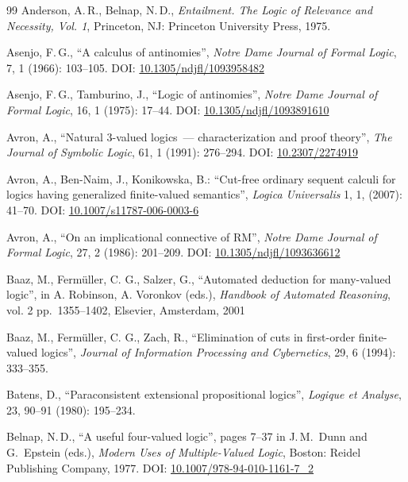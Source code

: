 \documentclass[10pt,a4paper]{article}
\theoremstyle{definition}
\newcommand{\3}{\vspace{.3in}}
\newcommand{\2}{\vspace{.2in}}
\newcommand{\1}{\vspace{.1in}}
\newcommand{\5}{\vspace{.05in}}
\newcommand\DOI[2]{DOI: \href{#1#2}{#2}}
\newcommand{\ts}{\,}
\begin{document}
\begin{thebibliography}{99}
Anderson, A.\ts R., Belnap, N.\ts D.,  \textit{Entailment. The Logic of Relevance and Necessity, Vol. 1}, Princeton, NJ: Princeton University Press, 1975.

Asenjo, F.\ts G., ``A calculus of antinomies'', \textit{Notre Dame Journal of Formal Logic}, 7, 1 (1966): 103--105.
\DOI{http://dx.doi.org/}{10.1305/ndjfl/1093958482}

Asenjo, F.\ts G., Tamburino, J., ``Logic of antinomies'', \textit{Notre Dame Journal of Formal Logic}, 16, 1 (1975): 17--44. 
\DOI{http://dx.doi.org/}{10.1305/ndjfl/1093891610}

Avron, A., ``Natural 3-valued logics~--- characterization and proof theory'', \textit{The Journal of Symbolic Logic}, 61, 1 (1991): 276--294.  
\DOI{http://dx.doi.org/}{10.2307/2274919}

Avron, A., Ben-Naim, J., Konikowska, B.:  ``Cut-free ordinary sequent calculi for logics having generalized finite-valued semantics'',  \textit{Logica Universalis} 1, 1, (2007): 41--70.  \DOI{http://dx.doi.org/}{10.1007/s11787-006-0003-6}

Avron, A., ``On an implicational connective of RM'', \textit{Notre Dame Journal of Formal Logic}, 27, 2 (1986): 201--209.
\DOI{http://dx.doi.org/}{10.1305/ndjfl/1093636612}

Baaz, M., Ferm\"uller, C. G., Salzer, G., ``Automated deduction for many-valued logic'',
in A. Robinson, A. Voronkov (eds.),  \textit{Handbook of Automated Reasoning}, vol. 2
pp.~1355--1402, Elsevier, Amsterdam, 2001


Baaz, M., Ferm\"uller, C. G., Zach, R., ``Elimination of cuts in first-order finite-valued logics'',
\textit{Journal of Information Processing and Cybernetics}, 29, 6 (1994): 333--355.


Batens, D., ``Paraconsistent extensional propositional logics'', \textit{Logique et Analyse}, 23, 90--91 (1980): 195--234.

 Belnap, N.\ts D., ``A useful four-valued logic'', pages 7--37 in J.\ts M.~Dunn and G.~Epstein (eds.), \textit{Modern Uses of Multiple-Valued Logic}, Boston: Reidel Publishing Company, 1977. \DOI{http://dx.doi.org/}{10.1007/978-94-010-1161-7\_2}


\end{thebibliography}
\end{document}
